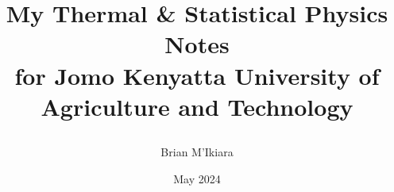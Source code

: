 \documentclass[letterpaper, 11pt]{report}
\title{
    \begin{center}
        \huge{My Thermal \& Statistical Physics Notes} \\
        \Large{for Jomo Kenyatta University of Agriculture and Technology} \\
        \author{Brian M'Ikiara}
        \date{May 2024}
    \end{center}
}
\begin{document}
    \maketitle
    \begin{abstract}
    \noindent\lipsum[1-2]
	\end{abstract}
    \tableofcontents \pagebreak
    \listoffigures \pagebreak
    
    \appendix
    
    
    
\end{document}
